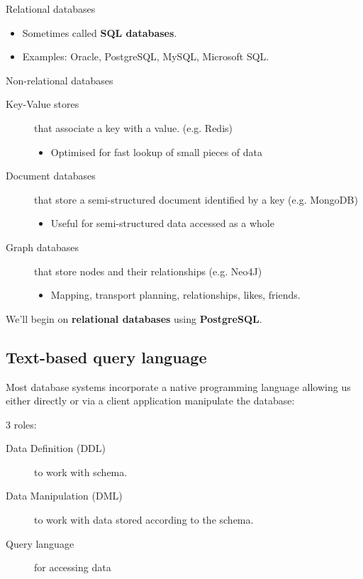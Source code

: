 \documentclass[slides]{pgnotes}
\begin{document}
\begin{greenbox}{Relational databases}
  \begin{itemize}
  \item Sometimes called \textbf{SQL databases}.
  \item Examples: Oracle, PostgreSQL, MySQL, Microsoft SQL.
  \end{itemize}
\end{greenbox}

\begin{bluebox}{Non-relational databases}
  \begin{description}
  \item[Key-Value stores] that associate a key with a value. (e.g. Redis)
    \begin{itemize}
    \item Optimised for fast lookup of small pieces of data
    \end{itemize}
  \item[Document databases] that store a semi-structured document identified by a key (e.g. MongoDB)
    \begin{itemize}
    \item Useful for semi-structured data accessed as a whole
    \end{itemize}
  \item[Graph databases] that store nodes and their relationships (e.g. Neo4J)
    \begin{itemize}
    \item Mapping, transport planning, relationships, likes, friends.
    \end{itemize}
  \end{description}
\end{bluebox}

We'll begin on \textbf{relational databases} using \textbf{PostgreSQL}.




\subsection{Text-based query language}

Most database systems incorporate a native programming language allowing us either directly or via a client application manipulate the database: 

\begin{greenbox}{3 roles:}
\begin{description}
\item[Data Definition (DDL)] to work with schema.
\item[Data Manipulation (DML)] to work with data stored according to the schema.
\item[Query language] for accessing data
\end{description}
\end{greenbox}
\end{document}
